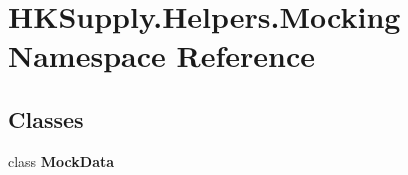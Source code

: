\hypertarget{namespace_h_k_supply_1_1_helpers_1_1_mocking}{}\section{H\+K\+Supply.\+Helpers.\+Mocking Namespace Reference}
\label{namespace_h_k_supply_1_1_helpers_1_1_mocking}
\subsection*{Classes}
\begin{DoxyCompactItemize}
\item 
class {\bfseries Mock\+Data}
\end{DoxyCompactItemize}
